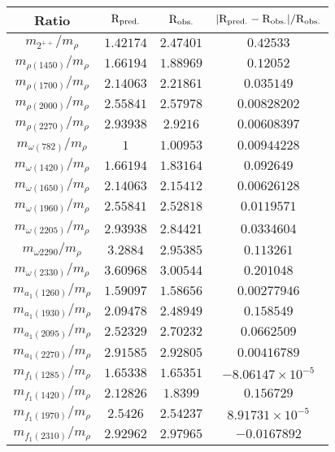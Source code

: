 \documentclass[a4paper,12pt]{article}
\begin{document}
\begin{table}
\centering
\begin{tabular}{ | c | c | c | c | }
\hline
Ratio & $\rm{R_{pred.}}$ & $\rm{R_{obs.}}$ & $|\rm{R_{pred.}} - \rm{R_{obs.}}| / \rm{R_{obs.}}$ \\
\hline
$m_{2^{++}} / m_\rho $  & $1.42174$	& $2.47401$ &	$0.42533$ \\
\hline
$m_{\rho(1450)}/m_\rho$ & $1.66194$ &	$1.88969$ & $0.12052$ \\
\hline
$m_{\rho(1700)} / m_\rho$ & $2.14063$ & $2.21861$ & $0.035149$ \\
\hline
$m_{\rho(2000)} / m_\rho$ & $2.55841$ & $2.57978$ & $0.00828202$ \\
\hline
$m_{\rho(2270)} / m_\rho $ & $2.93938$ & $2.9216$ & $0.00608397$ \\
\hline
$m_{\omega(782)} / m_{\rho}$ & $1$ & $1.00953$ & $0.00944228$ \\
\hline
$m_{\omega(1420)} / m_\rho$ & $1.66194$ &	$1.83164$ & $0.092649$ \\
\hline
$m_{\omega(1650)} / m_{\rho}$ & $2.14063$ & $2.15412$ & $0.00626128$ \\
\hline
$m_{\omega(1960)} / m_\rho$ & $2.55841$ &	$2.52818$ & $0.0119571$ \\
\hline
$m_{\omega(2205)} / m_{\rho}$ & 2.93938 &2.84421 &0.0334604 \\
\hline
$m_{\omega{2290}} / m_{\rho}$ & $3.2884$	& $2.95385$ & $0.113261$\\
\hline
$m_{\omega(2330)} / m_{\rho}$ & $3.60968$	& $3.00544$ &	$0.201048$ \\
\hline
$m_{a_1(1260)} / m_\rho$ & $1.59097$ &	 $1.58656$ & $0.00277946$ \\
\hline
$m_{a_1(1930)} / m_\rho $ & $2.09478$ & $2.48949$ &	$0.158549$ \\
\hline
$m_{a_1(2095)} / m_\rho$ & $2.52329$ &	 $2.70232$ & $0.0662509$ \\
\hline
$m_{a_1(2270)} / m_\rho$ & $2.91585$ & $2.92805$ & $0.00416789$ \\
\hline
$m_{f_1(1285)} / m_\rho$ & $1.65338$ &	$1.65351$ & $-8.06147\times10^{-5}$ \\
\hline
$m_{f_1(1420)} / m_{\rho}$ & $2.12826$ & $1.8399$ &  $0.156729$ \\
\hline
$m_{f_1(1970)} / m_{\rho}$ & $2.5426$ &	$2.54237$ & $8.91731 \times 10^{-5}$ \\
\hline
$m_{f_1(2310)} / m_{\rho}$ & $2.92962$ & $2.97965$ & $-0.0167892$ \\
\hline

\end{tabular}
\end{table}
\end{document}
